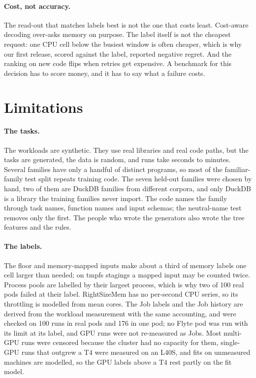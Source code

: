 \paragraph{Cost, not accuracy.}
The read-out that matches labels best is not the one that costs least. Cost-aware decoding over-asks memory on purpose. The
label itself is not the cheapest request: one CPU cell below the busiest window is often cheaper, which is why
our first release, scored against the label, reported negative regret. And the ranking on new code flips when
retries get expensive. A benchmark for this
decision has to score money, and it has to say what a failure costs.

\section{Limitations}
\label{sec:limitations}

\paragraph{The tasks.}
The workloads are synthetic. They use real libraries and real code paths, but the tasks are generated, the data is
random, and runs take seconds to minutes. Several families have only a handful of distinct programs, so most of the
familiar-family test split repeats training code. The seven held-out families were chosen by hand, two of them are
DuckDB families from different corpora, and only DuckDB is a library the training families never import. The code
names the family through task names, function names and input schemas; the neutral-name test removes only the
first. The people who wrote the generators also wrote the tree features and the rules.

\paragraph{The labels.}
The  floor and memory-mapped inputs make about a third of memory labels one cell larger than needed;
on tmpfs stagings a mapped input may be counted twice. Process pools are labelled by their largest process, which is
why two of 100 real pods failed at their label. RightSizeMem has no per-second CPU series, so its throttling is
modelled from mean cores. The Job labels and the Job history are derived from the workload measurement with the
same accounting, and were checked on 100 runs in real pods and 176 in one pod; no Flyte pod was run with its limit at
its label, and GPU runs were not re-measured as Jobs. Most multi-GPU runs were censored because the cluster had no
capacity for them, single-GPU runs that outgrew a T4 were measured on an L40S, and fits on unmeasured machines are
modelled, so the GPU labels above a T4 rest partly on the fit model.


